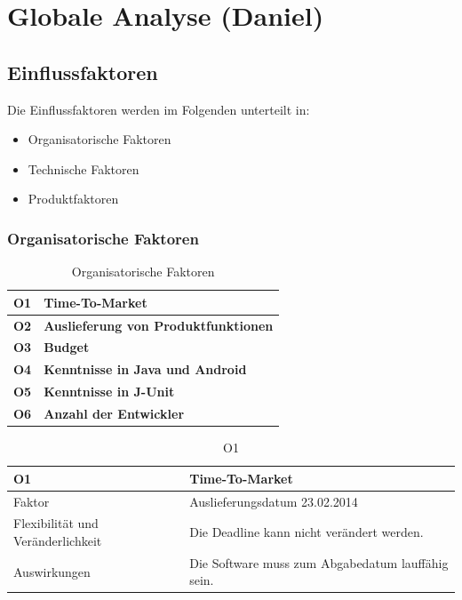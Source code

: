 \documentclass[fontsize=12pt,paper=a4,twoside]{scrartcl}
\begin{document}
\section{Globale Analyse (Daniel)}
\label{sec:globale_analyse}

\subsection{Einflussfaktoren}
\label{sec:einflussfaktoren}

Die Einflussfaktoren werden im Folgenden unterteilt in:

\begin{itemize}
\item{Organisatorische Faktoren}
\item{Technische Faktoren}
\item{Produktfaktoren}
\end{itemize}

\subsubsection{Organisatorische Faktoren}
\label{sec:orgfaktoren}

\begin{table}[H]
\centering
\caption{Organisatorische Faktoren}
\begin{tabular}{|l|l|} \hline
\textbf{O1} & \textbf{Time-To-Market} \\ \hline
\textbf{O2} & \textbf{Auslieferung von Produktfunktionen} \\ \hline
\textbf{O3} & \textbf{Budget} \\ \hline
\textbf{O4} & \textbf{Kenntnisse in Java und Android} \\ \hline
\textbf{O5} & \textbf{Kenntnisse in J-Unit} \\ \hline
\textbf{O6} & \textbf{Anzahl der Entwickler}\\ \hline
\end{tabular}
\end{table}

\begin{table}[H]
\caption{O1}
\begin{tabular}{|p{3cm}|p{12cm}|}\hline
\textbf{O1} & \textbf{Time-To-Market}\\ \hline \hline
Faktor & Auslieferungsdatum 23.02.2014\\ \hline
Flexibilität und Veränderlichkeit & Die Deadline kann nicht verändert werden.\\ \hline
Auswirkungen & Die Software muss zum Abgabedatum lauffähig sein.\\ \hline
\end{tabular}
\end{table}
\end{document}
